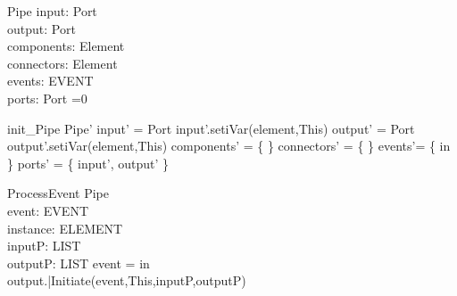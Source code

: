 \begin{schema}{Pipe}
input:  Port \\
output: Port \\
components: \pset Element \\
connectors: \pset Element \\
events: \pset EVENT \\
ports: \pset Port 
=0
\end{schema}


\begin{zed}
init\_Pipe \sdef \lsch Pipe' \bbar input' = \new Port \land input'.setiVar(element,This) \land output' = \new Port \land output'.setiVar(element,This) \land  components' = \{ \} \land  connectors' = \{ \} \land events'= \{ in \}  \land ports' = \{ input', output' \} \rsch  \end{zed}

\begin{schema}{ProcessEvent}
\Delta Pipe \\
event: EVENT \\
instance: ELEMENT \\
inputP: LIST \\
outputP: LIST 
\where event = in \\
output.|Initiate(event,This,inputP,outputP)
\end{schema}
